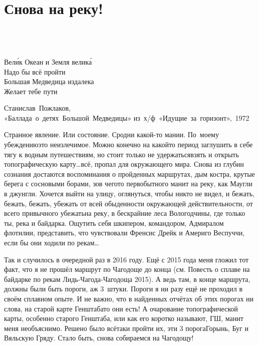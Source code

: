 \chapter{Снова на реку!} 

\epigraph{%
	~\\
	~\\	
	~\\	
	Вел\'{и}к Океан и Земля велик\'{а} \\
	Надо бы всё пройти \\
	Большая Медведица издалека \\
	Желает тебе пути}
	{
	\begin{flushright}
		\small{Станислав~Пожлаков,\\«Баллада~о~детях~Большой~Медведицы» из~х/ф~«Идущие~за~горизонт»,~1972}
	\end{flushright}
	}

Странное явление. Или состояние. Сродни какой-то мании. По~моему убеждению\mdash это неизлечимое. Можно конечно на какой\sdash то период заглушить в себе тягу к водным путешествиям, но стоит только не удержаться\mdash взять и открыть топографическую карту\ldots всё, пропал для окружающего мира. Снова из глубин сознания достаются воспоминания о пройденных маршрутах, дым костра, крутые берега с сосновыми борами, зов чего\sdash то первобытного манит на реку, как Маугли в джунгли. Хочется выйти на улицу, оглянуться, чтобы никто не видел, и бежать, бежать, бежать, убежать от всей обыденности окружающей действительности, от всего привычного убежать\mdash на реку, в бескрайние леса Вологодчины, где только ты, река и байдарка. Ощутить себя шкипером, командором, Адмиралом флотилии, представить, что чувствовали Френсис Дрейк и Америго Веспуччи, если бы они ходили по рекам\ldots 

Так и случилось в очередной раз в 2016 году. Ещё с 2015 года меня гложил тот факт, что я не прошёл маршрут по Чагодоще до конца (см. Повесть о сплаве на байдарке по рекам Лидь-Чагода-Чагодоща 2015). А ведь там, в конце маршрута, должны были быть пороги, аж 3~штуки. Пороги я ни разу ещё не проходил в своём сплавном опыте. И не важно, что в найденных отчётах об этих порогах ни слова, на старой карте Генштаба\sdash то они есть! А очарование топографической карты, особенно старого Генштаба, или как его коротко называют, ГШ, манит меня необъяснимо. Решено было всё\sdash таки пройти их, эти 3 порога\mdash Горынь, Буг и Вяльскую Гряду. Стало быть, снова собираемся на Чагодощу!

